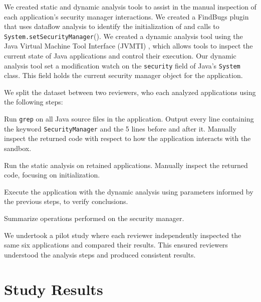 \documentclass{sig-alternate}
\begin{document}
We created static and dynamic analysis tools
to assist in the manual inspection of each application's security manager
interactions. We created a 
FindBugs \cite{hovemeyer_finding_2004} plugin
that uses dataflow analysis to identify the initialization of and calls to \texttt{System.setSecurityManager}().
We created a dynamic analysis tool using the Java Virtual Machine
Tool Interface (JVMTI) \cite{_jvmti}, which allows
tools to inspect the current state of Java applications and control
their execution. Our dynamic analysis tool set a modification watch
on the \texttt{security} field of Java's \texttt{System} class. This
field holds the current security manager object for the application.

We split the dataset between two reviewers, who each analyzed
applications using the following steps:

\begin{flushenum}\setlength{\parskip}{0pt}
  \setlength{\parsep}{0pt}
  \setlength{\itemsep}{0pt}
\item Run \texttt{grep} on all Java source files in the application.
Output every line containing the keyword \texttt{SecurityManager} and the 5
lines before and after it.  Manually inspect the returned code with respect to
how the application interacts with the sandbox.
\item Run the static analysis on retained applications. Manually inspect the
  returned code, focusing on initialization. 
\item Execute the application with the dynamic analysis using parameters
  informed by the previous steps, 
to verify conclusions.
\item Summarize operations performed
on the security manager.
\end{flushenum}

We undertook a pilot study where each reviewer
independently inspected the same six applications and compared their
results. This ensured reviewers understood the analysis steps and produced
consistent results.


\section{Study Results}\label{sec:Study-results}
\end{document}
